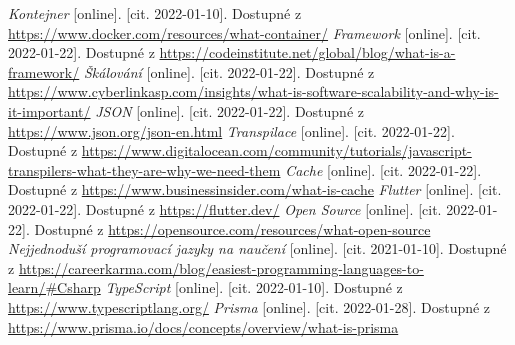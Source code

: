 \begin{thebibliography}{99}
     \textit{Kontejner} [online]. [cit. 2022-01-10]. Dostupné z \url{https://www.docker.com/resources/what-container/}
     \textit{Framework} [online]. [cit. 2022-01-22]. Dostupné z \url{https://codeinstitute.net/global/blog/what-is-a-framework/}
     \textit{Škálování} [online]. [cit. 2022-01-22]. Dostupné z \url{https://www.cyberlinkasp.com/insights/what-is-software-scalability-and-why-is-it-important/}
     \textit{JSON} [online]. [cit. 2022-01-22]. Dostupné z \url{https://www.json.org/json-en.html}
     \textit{Transpilace} [online]. [cit. 2022-01-22]. Dostupné z \url{https://www.digitalocean.com/community/tutorials/javascript-transpilers-what-they-are-why-we-need-them}
     \textit{Cache} [online]. [cit. 2022-01-22]. Dostupné z \url{https://www.businessinsider.com/what-is-cache}
     \textit{Flutter} [online]. [cit. 2022-01-22]. Dostupné z \url{https://flutter.dev/}
     \textit{Open Source} [online]. [cit. 2022-01-22]. Dostupné z \url{https://opensource.com/resources/what-open-source}
     \textit{Nejjednoduší programovací jazyky na naučení} [online]. [cit. 2021-01-10]. Dostupné z \url{https://careerkarma.com/blog/easiest-programming-languages-to-learn/#Csharp}
     \textit{TypeScript} [online]. [cit. 2022-01-10]. Dostupné z \url{https://www.typescriptlang.org/}
     \textit{Prisma} [online]. [cit. 2022-01-28]. Dostupné z \url{https://www.prisma.io/docs/concepts/overview/what-is-prisma}
\end{thebibliography}


